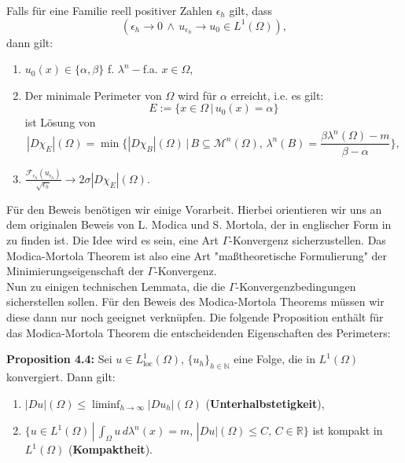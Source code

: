 \newpage
{}\colorbox{generalYellow}{\begin{minipage}{16cm}{\textcolor{black}{}{\label{theo4.3b}}}
Falls für eine Familie reell positiver Zahlen \(\epsilon_h\) gilt, dass
\begin{equation}
    (\epsilon_h \to 0 \, \land \, u_{\epsilon_h} \to u_0 \in L^1(\Omega)),
\end{equation}
dann gilt:
\begin{enumerate}
    \item \(u_0(x) \in \{\alpha,\beta\}\) f. \(\lambda^n-\)f.a. \(x \in \Omega\),
    \item Der minimale Perimeter von \(\Omega\) wird für \(\alpha\) erreicht, i.e. es gilt:
    \begin{equation}
        E := \{x \in \Omega \, | \, u_0(x)=\alpha\}
    \end{equation}
    ist Lösung von
    \begin{equation}
        |D\chi_E |(\Omega) = \min \{|D\chi_B |(\Omega) \, | \, B \subseteq \mathcal{M}^n(\Omega), \, \lambda^n(B) = \frac{\beta \lambda^n(\Omega) - m}{\beta - \alpha}\},
    \end{equation}
    \item \(\frac{\mathcal{F}_{\epsilon_h}(u_{\epsilon_h})}{\sqrt{\epsilon_h}} \to 2\sigma |D\chi_E |(\Omega)\).
\end{enumerate}
\end{minipage}}

Für den Beweis benötigen wir einige Vorarbeit. Hierbei orientieren wir uns an dem originalen Beweis von L. Modica und S. Mortola, der in englischer Form in \cite{modica1987gradient} zu finden ist. Die Idee wird es sein, eine Art \(\Gamma\)-Konvergenz sicherzustellen. Das Modica-Mortola Theorem ist also eine Art "maßtheoretische Formulierung" der Minimierungseigenschaft der \(\Gamma\)-Konvergenz.\\

Nun zu einigen technischen Lemmata, die die \(\Gamma\)-Konvergenzbedingungen sicherstellen sollen. Für den Beweis des Modica-Mortola Theorems müssen wir diese dann nur noch geeignet verknüpfen. Die folgende Proposition enthält für das Modica-Mortola Theorem die entscheidenden Eigenschaften des Perimeters:\\[0.5cm]
\colorbox{generalYellow}{\begin{minipage}{16cm}{\textcolor{black}{}{\label{prop4.4}}}
\textbf{Proposition 4.4:} Sei \(u \in L^1_{\text{loc}}(\Omega)\), \(\{u_h\}_{h \in \mathbb{N}}\) eine Folge, die in \(L^1(\Omega)\) konvergiert. Dann gilt:
\begin{enumerate}
    \item \(|Du|(\Omega) \leq \liminf_{h \to \infty} |Du_h|(\Omega)\) (\textbf{Unterhalbstetigkeit}),
    \item \(\{u \in L^1(\Omega) \, | \, \int_{\Omega} u \, d\lambda^n(x) = m, \, |Du|(\Omega) \leq C, \, C \in \mathbb{R}\}\) ist kompakt in \(L^1(\Omega)\) (\textbf{Kompaktheit}).
\end{enumerate}
\end{minipage}}

